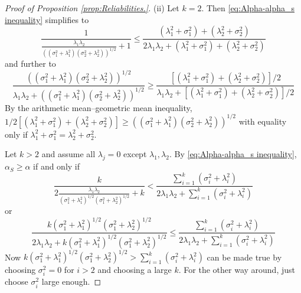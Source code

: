 \documentclass[twoside]{article}
\DeclareMathOperator{\tsum}{\textstyle \sum}
\renewcommand{\sqrt}[1]{{(#1)^{1/2}}}
\begin{document}
\begin{proof}[Proof of Proposition \ref{prop:Reliabilities.}]
(ii) Let $k=2$. Then \eqref{eq:Alpha-alpha_s inequality} simplifies to
\[
\frac{1}{\frac{\lambda_{1}\lambda_{2}}{\sqrt{(\sigma_{1}^{2}+\lambda_{1}^{2})(\sigma_{2}^{2}+\lambda_{2}^{2})}}+1}\leq\frac{(\lambda_{1}^{2}+\sigma_{1}^{2})+(\lambda_{2}^{2}+\sigma_{2}^{2})}{2\lambda_{1}\lambda_{2}+(\lambda_{1}^{2}+\sigma_{1}^{2})+(\lambda_{2}^{2}+\sigma_{2}^{2})}
\]
and further to
\begin{equation*}
\frac{\sqrt{(\sigma_{1}^{2}+\lambda_{1}^{2})(\sigma_{2}^{2}+\lambda_{2}^{2})}}{\lambda_{1}\lambda_{2}+\sqrt{(\sigma_{1}^{2}+\lambda_{1}^{2})(\sigma_{2}^{2}+\lambda_{2}^{2})}} \geq \frac{[(\lambda_{1}^{2}+\sigma_{1}^{2})+(\lambda_{2}^{2}+\sigma_{2}^{2})]/2}{\lambda_{1}\lambda_{2}+[(\lambda_{1}^{2}+\sigma_{1}^{2})+(\lambda_{2}^{2}+\sigma_{2}^{2})]/2}
\end{equation*}
By the arithmetic mean--geometric mean inequality, $1/2[(\lambda_{1}^{2}+\sigma_{1}^{2})+(\lambda_{2}^{2}+\sigma_{2}^{2})]\geq\sqrt{(\sigma_{1}^{2}+\lambda_{1}^{2})(\sigma_{2}^{2}+\lambda_{2}^{2})}$
with equality only if $\lambda_{1}^{2}+\sigma_{1}^{2}=\lambda_{2}^{2}+\sigma_{2}^{2}$.

Let $k>2$ and assume all $\lambda_{j}=0$
except $\lambda_{1},\lambda_{2}$. By \eqref{eq:Alpha-alpha_s inequality}, $\alpha_S \geq \alpha$ if and
only if
\[
\frac{k}{2\frac{\lambda_{1}\lambda_{2}}{\sqrt{\sigma_{1}^{2}+\lambda_{1}^{2}}\sqrt{\sigma_{1}^{2}+\lambda_{2}^{2}}}+k}<\frac{\tsum_{i=1}^{k}(\sigma_{i}^{2}+\lambda_{i}^{2})}{2\lambda_{1}\lambda_{2}+\tsum_{i=1}^{k}(\sigma_{i}^{2}+\lambda_{i}^{2})}
\]
or
\begin{equation*}
\frac{k\sqrt{\sigma_{1}^{2}+\lambda_{1}^{2}}\sqrt{\sigma_{1}^{2}+\lambda_{2}^{2}}}{2\lambda_{1}\lambda_{2}+k\sqrt{\sigma_{1}^{2}+\lambda_{1}^{2}}\sqrt{\sigma_{1}^{2}+\lambda_{2}^{2}}} \leq \frac{\tsum_{i=1}^{k}(\sigma_{i}^{2}+\lambda_{i}^{2})}{2\lambda_{1}\lambda_{2}+\tsum_{i=1}^{k}(\sigma_{i}^{2}+\lambda_{i}^{2})}
\end{equation*}
Now $k\sqrt{\sigma_{1}^{2}+\lambda_{1}^{2}}\sqrt{\sigma_{1}^{2}+\lambda_{2}^{2}}>\tsum_{i=1}^{k}(\sigma_{i}^{2}+\lambda_{i}^{2})$
can be made true by choosing $\sigma_{i}^{2}=0$ for $i>2$ and choosing a large $k$. For the
other way around, just choose $\sigma_{i}^{2}$ large enough.


\end{proof}
\end{document}

